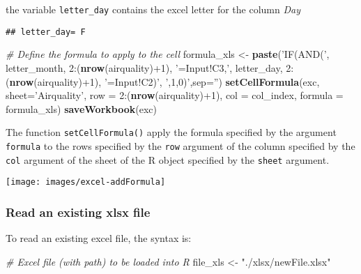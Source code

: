 \documentclass[]{book}
\newenvironment{Shaded}{\begin{snugshade}}{\end{snugshade}}
\newcommand{\KeywordTok}[1]{\textcolor[rgb]{0.13,0.29,0.53}{\textbf{{#1}}}}
\newcommand{\DataTypeTok}[1]{\textcolor[rgb]{0.13,0.29,0.53}{{#1}}}
\newcommand{\DecValTok}[1]{\textcolor[rgb]{0.00,0.00,0.81}{{#1}}}
\newcommand{\StringTok}[1]{\textcolor[rgb]{0.31,0.60,0.02}{{#1}}}
\newcommand{\CommentTok}[1]{\textcolor[rgb]{0.56,0.35,0.01}{\textit{{#1}}}}
\newcommand{\NormalTok}[1]{{#1}}
\begin{document}
the variable \texttt{letter\_day} contains the excel letter for the
column \emph{Day}

\begin{verbatim}
## letter_day= F
\end{verbatim}

\begin{Shaded}
\begin{Highlighting}[]
\CommentTok{# Define the formula to apply to the cell}
\NormalTok{formula_xls <-}\StringTok{ }\KeywordTok{paste}\NormalTok{(}\StringTok{'IF(AND('}\NormalTok{,}
                    \NormalTok{letter_month,}
                    \DecValTok{2}\NormalTok{:(}\KeywordTok{nrow}\NormalTok{(airquality)+}\DecValTok{1}\NormalTok{),}
                    \StringTok{'=Input!C3,'}\NormalTok{,}
                    \NormalTok{letter_day,}
                    \DecValTok{2}\NormalTok{:(}\KeywordTok{nrow}\NormalTok{(airquality)+}\DecValTok{1}\NormalTok{),}
                    \StringTok{'=Input!C2)'}\NormalTok{,}
                    \StringTok{',1,0)'}\NormalTok{,}\DataTypeTok{sep=}\StringTok{''}\NormalTok{)}
\KeywordTok{setCellFormula}\NormalTok{(exc, }\DataTypeTok{sheet=}\StringTok{'Airquality'}\NormalTok{, }\DataTypeTok{row =} \DecValTok{2}\NormalTok{:(}\KeywordTok{nrow}\NormalTok{(airquality)+}\DecValTok{1}\NormalTok{), }\DataTypeTok{col =} \NormalTok{col_index, }\DataTypeTok{formula =} \NormalTok{formula_xls)}
\KeywordTok{saveWorkbook}\NormalTok{(exc)}
\end{Highlighting}
\end{Shaded}

The function \texttt{setCellFormula()} apply the formula specified by
the argument \texttt{formula} to the rows specified by the \texttt{row}
argument of the column specified by the \texttt{col} argument of the
sheet of the R object specified by the \texttt{sheet} argument.

\texttt{[image: images/excel-addFormula]}

\subsubsection{Read an existing xlsx
file}\label{read-an-existing-xlsx-file}

To read an existing excel file, the syntax is:

\begin{Shaded}
\begin{Highlighting}[]
\CommentTok{# Excel file (with path) to be loaded into R}
\NormalTok{file_xls <-}\StringTok{ "./xlsx/newFile.xlsx"}
\end{Highlighting}
\end{Shaded}
\end{document}
